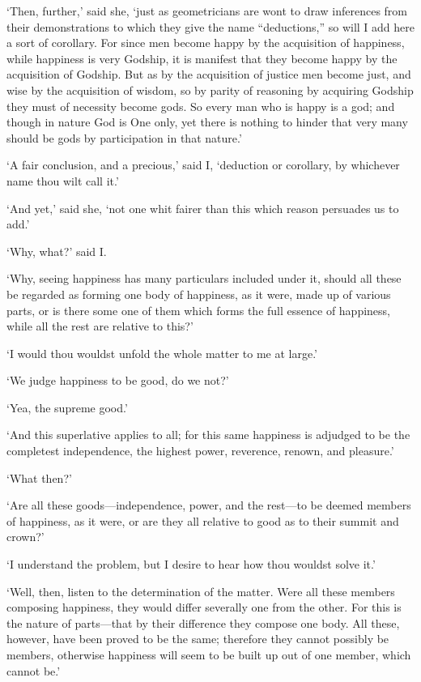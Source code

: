 \documentclass[11pt]{book}
\begin{document}
`Then, further,' said she, `just as geometricians are wont to draw
inferences from their demonstrations to which they give the name
``deductions,'' so will I add here a sort of corollary. For since men
become happy by the acquisition of happiness, while happiness is very
Godship, it is manifest that they become happy by the acquisition of
Godship. But as by the acquisition of justice men become just, and wise
by the acquisition of wisdom, so by parity of reasoning by acquiring
Godship they must of necessity become gods. So every man who is happy is
a god; and though in nature God is One only, yet there is nothing to
hinder that very many should be gods by participation in that nature.'

`A fair conclusion, and a precious,' said I, `deduction or corollary, by
whichever name thou wilt call it.'

`And yet,' said she, `not one whit fairer than this which reason
persuades us to add.'

`Why, what?' said I.

`Why, seeing happiness has many particulars in\-clud\-ed under it, should
all these be regarded as forming one body of happiness, as it were, made
up of various parts, or is there some one of them which forms the full
essence of happiness, while all the rest are relative to this?'

`I would thou wouldst unfold the whole matter to me at large.'

`We judge happiness to be good, do we not?'

`Yea, the supreme good.'

`And this superlative applies to all; for this same happiness is
adjudged to be the completest independence, the highest power,
reverence, renown, and pleasure.'

`What then?'

`Are all these goods---independence, power, and the rest---to be deemed
members of happiness, as it were, or are they all relative to good as to
their summit and crown?'

`I understand the problem, but I desire to hear how thou wouldst solve
it.'

`Well, then, listen to the determination of the matter. Were all these
members composing happiness, they would differ severally one from the
other. For this is the nature of parts---that by their difference they
compose one body. All these, however, have been proved to be the same;
therefore they cannot possibly be members, otherwise happiness will seem
to be built up out of one member, which cannot be.'
\end{document}
